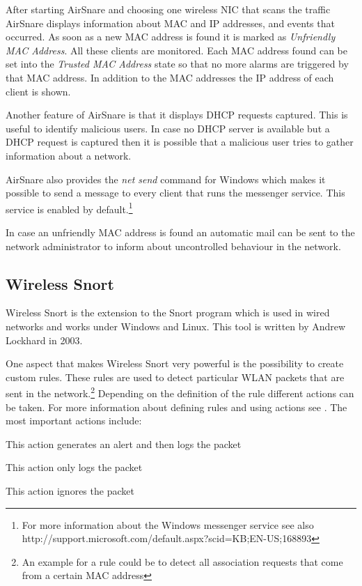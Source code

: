 After starting AirSnare and choosing one wireless NIC that scans the traffic AirSnare displays information about MAC and IP addresses, and events that occurred. As soon as a new MAC address is found it is marked as {\em Unfriendly MAC Address}. All these clients are monitored. Each MAC address found can be set into the {\em Trusted MAC Address} state so that no more alarms are triggered by that MAC address.  In addition to the MAC addresses the IP address of each client is shown.

Another feature of AirSnare is that it displays DHCP requests captured. This is useful to identify malicious users. In case no DHCP server is available but a DHCP request is captured then it is possible that a malicious user tries to gather information about a network.

AirSnare also provides the {\em net send} command for Windows which makes it possible to send a message to every client that runs the messenger service. This service is enabled by default.\footnote{For more information about the Windows messenger service see also http://support.microsoft.com/default.aspx?scid=KB;EN-US;168893}

In case an unfriendly MAC address is found an automatic mail can be sent to the network administrator to inform about uncontrolled behaviour in the network.

\subsection*{Wireless Snort}

Wireless Snort is the extension to the Snort program which is used in wired networks and works under Windows and Linux. This tool is written by Andrew Lockhard in 2003.

One aspect that makes Wireless Snort very powerful is the possibility to create custom rules. These rules are used to detect particular WLAN packets that are sent in the network.\footnote{An example for a rule could be to detect all association requests that come from a certain MAC address} Depending on the definition of the rule different actions can be taken. For more information about defining rules and using actions see \cite{wireless_snort_rules}. The most important actions include:

\begin{description}
	\addtolength{\itemsep}{-1.5ex}
    \item[alert:] This action generates an alert and then logs the packet
	\item[log:] This action only logs the packet
	\item[pass:] This action ignores the packet
\end{description}

